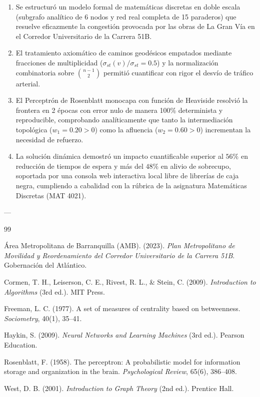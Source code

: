 \documentclass[11pt,letterpaper]{article}
\begin{document}
\begin{enumerate}
    \item Se estructuró un modelo formal de matemáticas discretas en doble escala (subgrafo analítico de 6 nodos y red real completa de 15 paraderos) que resuelve eficazmente la congestión provocada por las obras de La Gran Vía en el Corredor Universitario de la Carrera 51B.
    \item El tratamiento axiomático de caminos geodésicos empatados mediante fracciones de multiplicidad ($\sigma_{st}(v)/\sigma_{st} = 0.5$) y la normalización combinatoria sobre $\binom{n-1}{2}$ permitió cuantificar con rigor el desvío de tráfico arterial.
    \item El Perceptrón de Rosenblatt monocapa con función de Heaviside resolvió la frontera en 2 épocas con error nulo de manera 100\% determinista y reproducible, comprobando analíticamente que tanto la intermediación topológica ($w_1 = 0.20 > 0$) como la afluencia ($w_2 = 0.60 > 0$) incrementan la necesidad de refuerzo.
    \item La solución dinámica demostró un impacto cuantificable superior al $56\%$ en reducción de tiempos de espera y más del $48\%$ en alivio de sobrecupo, soportada por una consola web interactiva local libre de librerías de caja negra, cumpliendo a cabalidad con la rúbrica de la asignatura Matemáticas Discretas (MAT 4021).
\end{enumerate}

---

\begin{thebibliography}{99}

Área Metropolitana de Barranquilla (AMB). (2023). \textit{Plan Metropolitano de Movilidad y Reordenamiento del Corredor Universitario de la Carrera 51B}. Gobernación del Atlántico.

Cormen, T. H., Leiserson, C. E., Rivest, R. L., \& Stein, C. (2009). \textit{Introduction to Algorithms} (3rd ed.). MIT Press.

Freeman, L. C. (1977). A set of measures of centrality based on betweenness. \textit{Sociometry}, 40(1), 35--41.

Haykin, S. (2009). \textit{Neural Networks and Learning Machines} (3rd ed.). Pearson Education.

Rosenblatt, F. (1958). The perceptron: A probabilistic model for information storage and organization in the brain. \textit{Psychological Review}, 65(6), 386--408.

West, D. B. (2001). \textit{Introduction to Graph Theory} (2nd ed.). Prentice Hall.

\end{thebibliography}
\end{document}
